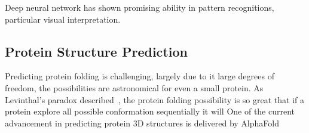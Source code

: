 Deep neural network has shown promising ability in pattern recognitions, particular visual interpretation.
\par 

\subsection{Protein Structure Prediction}
Predicting protein folding is challenging, largely due to it large degrees of freedom, the possibilities are astronomical for even a small protein. As Levinthal's paradox described~, the protein folding possibility is so great that if a protein explore all possible conformation sequentially it will  One of the current advancement in predicting protein 3D structures is delivered by AlphaFold